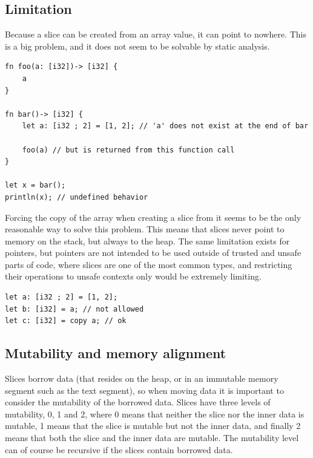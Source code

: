 \subsection{Limitation}%
\label{sec:slice_lim}

Because a slice can be created from an array value, it can point to nowhere.
This is a big problem, and it does not seem to be solvable by static analysis.

\begin{lstlisting}[style=coloredverbatim]
fn foo(a: [i32])-> [i32] {
    a
}

fn bar()-> [i32] {
    let a: [i32 ; 2] = [1, 2]; // 'a' does not exist at the end of bar

    foo(a) // but is returned from this function call
}

let x = bar();
println(x); // undefined behavior
\end{lstlisting}

Forcing the copy of the array when creating a slice from it seems to be the only
reasonable way to solve this problem. This means that slices never point to
memory on the stack, but always to the heap. The same limitation exists for
pointers, but pointers are not intended to be used outside of
trusted and unsafe parts of code, where slices are one of the most common types,
and restricting their operations to unsafe contexts only would be extremely
limiting.

\begin{lstlisting}[style=coloredverbatimError]
let a: [i32 ; 2] = [1, 2];
let b: [i32] = a; // not allowed
let c: [i32] = copy a; // ok
\end{lstlisting}



\subsection{Mutability and memory alignment}

Slices borrow data (that resides on the heap, or in an immutable memory segment
such as the text segment), so when moving data it is important to consider the mutability of the
borrowed data. Slices have three levels of mutability, 0, 1 and 2, where 0 means
that neither the slice nor the inner data is mutable, 1 means that the slice is
mutable but not the inner data, and finally 2 means that both the slice and the
inner data are mutable. The mutability level can of course be recursive if the
slices contain borrowed data.


